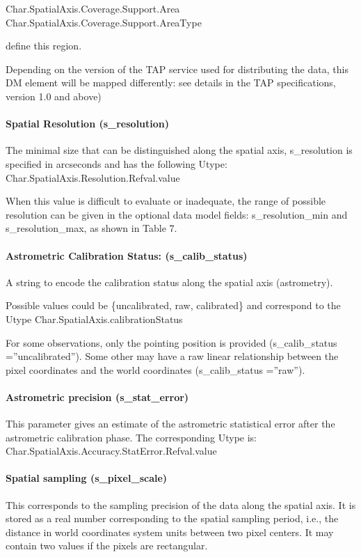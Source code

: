 \documentclass[11pt,a4paper]{ivoa}
\begin{document}
Char.SpatialAxis.Coverage.Support.Area Char.SpatialAxis.Coverage.Support.AreaType

define this region. 

Depending on the version of the TAP service used for distributing the data, this DM element will be mapped differently:
see details in the TAP specifications, version 1.0 and above)

\paragraph{Spatial Resolution (s\_resolution)}
The minimal size that can be distinguished along the spatial axis, s\_resolution is specified in arcseconds and has the
following Utype: Char.SpatialAxis.Resolution.Refval.value

When this value is difficult to evaluate or inadequate, the range of possible resolution can be given in the optional
data model fields: s\_resolution\_min and s\_resolution\_max, as shown in Table 7.

\paragraph{Astrometric Calibration Status: (s\_calib\_status)}
A string to encode the calibration status along the spatial axis (astrometry). 

Possible values could be \{uncalibrated, raw, calibrated\} and correspond to the Utype
Char.SpatialAxis.calibrationStatus 

For some observations, only the pointing position is provided (s\_calib\_status =''uncalibrated''). Some other may have
a raw linear relationship between the pixel coordinates and the world coordinates (s\_calib\_status =''raw'').

\paragraph{Astrometric precision (s\_stat\_error)}
This parameter gives an estimate of the astrometric statistical error after the astrometric calibration phase.  The
corresponding Utype is:  Char.SpatialAxis.Accuracy.StatError.Refval.value

\paragraph{Spatial sampling (s\_pixel\_scale)}
This corresponds to the sampling precision of the data along the spatial axis. It is stored as a real number
corresponding to the spatial sampling period, i.e., the distance in world coordinates system units between two pixel
centers.  It may contain two values if the pixels are rectangular.
\end{document}
